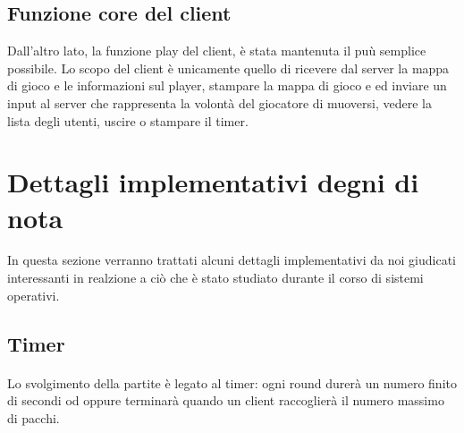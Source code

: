\documentclass[a4paper]{article}
\begin{document}


\subsection{Funzione core del client}
Dall'altro lato, la funzione play del client, è stata mantenuta il puù semplice possibile.
Lo scopo del client è unicamente quello di ricevere dal server la mappa di gioco e le informazioni sul player,
 stampare la mappa di gioco e ed inviare un input al server che rappresenta la volontà del giocatore di muoversi, vedere la lista degli utenti, uscire o stampare il timer.


\pagebreak
\section{Dettagli implementativi degni di nota}
In questa sezione verranno trattati alcuni dettagli implementativi da noi giudicati interessanti in realzione a ciò che è stato studiato durante il corso di sistemi operativi.
\subsection{Timer}
\paragraph{}
Lo svolgimento della partite è legato al timer:  ogni round durerà un numero finito di secondi od oppure terminarà
quando un client raccoglierà il numero massimo di pacchi.
\end{document}

